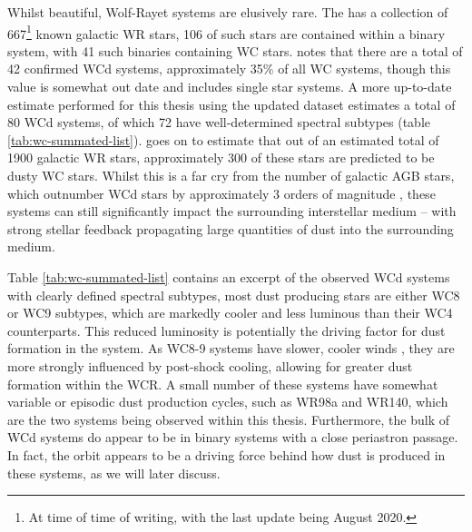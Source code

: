 Whilst beautiful, Wolf-Rayet systems are elusively rare.
The  \parencite{rossloweSpatialDistributionGalactic2015} has a collection of 667\footnote{At time of time of writing, with the last update being August 2020.} known galactic WR stars, 106 of such stars are contained within a binary system, with 41 such binaries containing WC stars.
\textcite{rossloweSpatialDistributionGalactic2015} notes that there are a total of 42 confirmed WCd systems, approximately 35\% of all WC systems, though this value is somewhat out date and includes single star systems.
A more up-to-date estimate performed for this thesis using the updated dataset estimates a total of 80 WCd systems, of which 72 have well-determined spectral subtypes (table \ref{tab:wc-summated-list}).
\textcite{rossloweSpatialDistributionGalactic2015} goes on to estimate that out of an estimated total of 1900 galactic WR stars, approximately 300 of these stars are predicted to be dusty WC stars.
Whilst this is a far cry from the number of galactic AGB stars, which outnumber WCd stars by approximately 3 orders of magnitude \parencite{ishiharaGalacticDistributionsCarbon2011}, these systems can still significantly impact the surrounding interstellar medium -- with strong stellar feedback propagating large quantities of dust into the surrounding medium.

Table \ref{tab:wc-summated-list} contains an excerpt of the observed WCd systems with clearly defined spectral subtypes, most dust producing stars are either WC8 or WC9 subtypes, which are markedly cooler and less luminous than their WC4 counterparts.
This reduced luminosity is potentially the driving factor for dust formation in the system.
As WC8-9 systems have slower, cooler winds \parencite{niedzielskiKinematicalStructureWolfRayet2002}, they are more strongly influenced by post-shock cooling, allowing for greater dust formation within the WCR.
A small number of these systems have somewhat variable or episodic dust production cycles, such as WR98a and WR140, which are the two systems being observed within this thesis.
Furthermore, the bulk of WCd systems do appear to be in binary systems with a close periastron passage.
In fact, the orbit appears to be a driving force behind how dust is produced in these systems, as we will later discuss.

